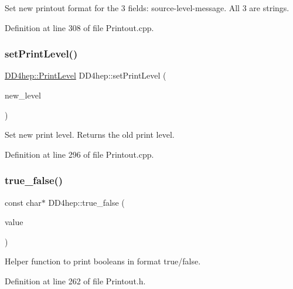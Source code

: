 Set new printout format for the 3 fields\+: source-\/level-\/message. All 3 are strings. 



Definition at line 308 of file Printout.\+cpp.

\hypertarget{namespace_d_d4hep_a01aab75bd90e7887aaec1fbf3b4eb03d}{}\label{namespace_d_d4hep_a01aab75bd90e7887aaec1fbf3b4eb03d} 
\subsubsection{\texorpdfstring{set\+Print\+Level()}{setPrintLevel()}}
{\footnotesize\ttfamily \hyperlink{namespace_d_d4hep_a5b5a64d56252469451f2020a27d57d42}{D\+D4hep\+::\+Print\+Level} D\+D4hep\+::set\+Print\+Level (\begin{DoxyParamCaption}\item[{\hyperlink{namespace_d_d4hep_a5b5a64d56252469451f2020a27d57d42}{Print\+Level}}]{new\+\_\+level }\end{DoxyParamCaption})}



Set new print level. Returns the old print level. 



Definition at line 296 of file Printout.\+cpp.

\hypertarget{namespace_d_d4hep_a32a48a8889b636138d95a06c5818a858}{}\label{namespace_d_d4hep_a32a48a8889b636138d95a06c5818a858} 
\subsubsection{\texorpdfstring{true\+\_\+false()}{true\_false()}}
{\footnotesize\ttfamily const char$\ast$ D\+D4hep\+::true\+\_\+false (\begin{DoxyParamCaption}\item[{bool}]{value }\end{DoxyParamCaption})\hspace{0.3cm}{\ttfamily [inline]}}



Helper function to print booleans in format true/false. 



Definition at line 262 of file Printout.\+h.

\hypertarget{namespace_d_d4hep_ad28e7066d6a18fdd0422755c43425883}{}\label{namespace_d_d4hep_ad28e7066d6a18fdd0422755c43425883} 
